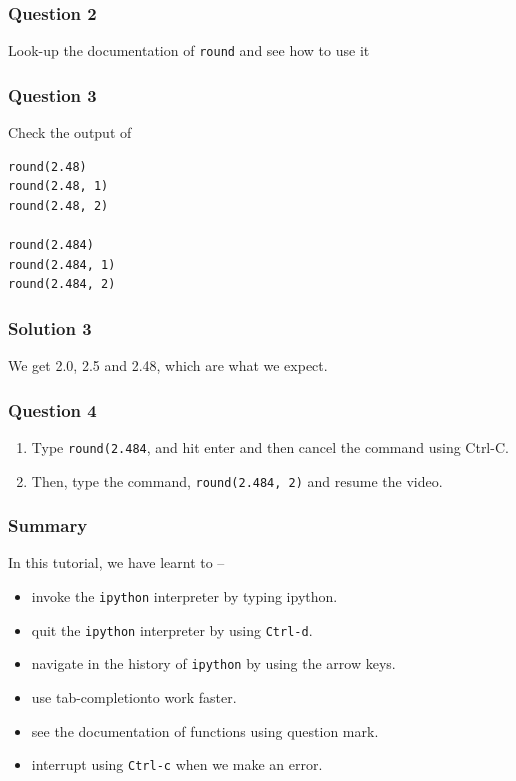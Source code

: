 \documentclass[presentation]{beamer}
\begin{document}
\begin{frame}
\frametitle{Question 2}
\label{sec-4}

  Look-up the documentation of \texttt{round} and see how to use it
\end{frame}
\begin{frame}[fragile]
\frametitle{Question 3}
\label{sec-5}

  Check the output of
\lstset{language=Python}
\begin{lstlisting}
round(2.48)
round(2.48, 1)
round(2.48, 2)

round(2.484)
round(2.484, 1)
round(2.484, 2)
\end{lstlisting}
\end{frame}
\begin{frame}
\frametitle{Solution 3}
\label{sec-6}

  We get 2.0, 2.5 and 2.48, which are what we expect. 
\end{frame}
\begin{frame}
\frametitle{Question 4}
\label{sec-7}


\begin{enumerate}
\item Type \texttt{round(2.484}, and hit enter and then cancel the command
     using Ctrl-C.
\item Then, type the command, \texttt{round(2.484, 2)} and resume
     the video.
\end{enumerate}
\end{frame}
\begin{frame}
\frametitle{Summary}
\label{sec-8}

  In this tutorial, we have learnt to –

\begin{itemize}
\item invoke the \verb~ipython~ interpreter by typing ipython.
\item quit the \verb~ipython~ interpreter by using \verb~Ctrl-d~.
\item navigate in the history of \verb~ipython~ by using the arrow keys.
\item use tab-completionto work faster.
\item see the documentation of functions using question mark.
\item interrupt using \verb~Ctrl-c~ when we make an error.
\end{itemize}
\end{frame}
\end{document}
